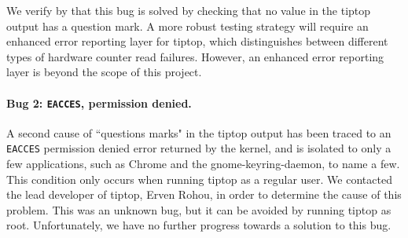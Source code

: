 We verify by that this bug is solved by checking that no value in the tiptop output has a question mark. A more robust testing strategy will require an enhanced error reporting layer for tiptop, which distinguishes between different types of hardware counter read failures. However, an enhanced error reporting layer is beyond the scope of this project.

\paragraph{Bug 2: \texttt{EACCES}, permission denied.}
A second cause of ``questions marks" in the tiptop output has been traced to an \texttt{EACCES} permission denied error returned by the kernel, and is isolated to only a few applications, such as Chrome and the gnome-keyring-daemon, to name a few.
This condition only occurs when running tiptop as a regular user.
We contacted the lead developer of tiptop, Erven Rohou, in order to determine the cause of this problem.
This was an unknown bug, but it can be avoided by running tiptop as root.
Unfortunately, we have no further progress towards a solution to this bug.